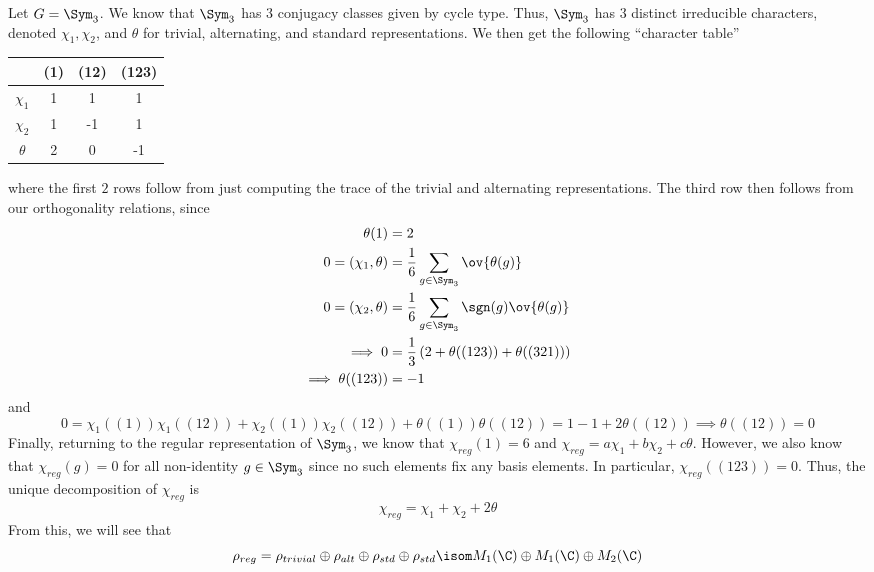 \documentclass[11pt,leqno,oneside]{amsbook}
\numberwithin{thm}{section}
\begin{document}
\begin{example}
  Let \(G = \Sym_3\). We know that \(\Sym_3\) has \(3\) conjugacy
  classes given by cycle type. Thus, \(\Sym_3\) has \(3\) distinct
  irreducible characters, denoted \(\chi_1, \chi_2\), and \(\theta\)
  for trivial, alternating, and standard representations. We then get
  the following ``character table'' \\
  \begin{center}
    \begin{tabular}{c|ccc}
      &(1)&(12)&(123) \\
      \hline
      \(\chi_1\) &1&1&1 \\
      \(\chi_2\) &1&-1&1\\
      \(\theta\) &2&0&-1
    \end{tabular}
  \end{center}
  where the first \(2\) rows follow from just computing the trace of
  the trivial and alternating representations. The third row then
  follows from our orthogonality relations, since
  \begin{align*}
    \theta(1) & = 2 \\
    0 = (\chi_1,\theta) & = \frac{1}{6} \sum_{g \in \Sym_3}
    \ov{\theta(g)} \\
    0 = (\chi_2, \theta) & = \frac{1}{6} \sum_{g \in \Sym_3} \sgn(g)
    \ov{\theta(g)} \\
    \implies 0 & = \frac{1}{3}\left( 2 + \theta((123)) + \theta((321))
    \right) \\
    \implies \theta((123)) & = -1
  \end{align*}
  and \[
    0 = \chi_1((1)) \chi_1((12)) + \chi_2((1)) \chi_2((12)) +
    \theta((1)) \theta((12)) = 1 - 1 + 2 \theta((12)) \implies
    \theta((12)) = 0
  \]
  Finally, returning to the regular representation of \(\Sym_3\), we
  know that \(\chi_{reg}(1) = 6\) and \(\chi_{reg} = a \chi_1 + b
  \chi_2 + c \theta\). However, we also know that \(\chi_{reg}(g) =
  0\) for all non-identity \(g \in \Sym_3\) since no such elements fix
  any basis elements. In particular,
  \(\chi_{reg}((123)) = 0\). Thus, the unique
  decomposition of \(\chi_{reg}\) is \[
    \chi_{reg} = \chi_1 + \chi_2 + 2 \theta
  \]
  From this, we will see that \[
    \rho_{reg} = \rho_{trivial} \oplus \rho_{alt} \oplus \rho_{std}
    \oplus \rho_{std} \isom M_1(\C) \oplus M_1(\C) \oplus M_2(\C)
  \]
\end{example}
\end{document}
